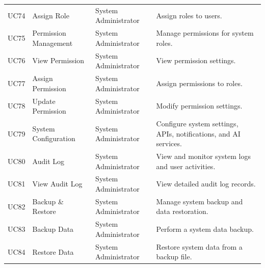 \begin{longtable}{@{}p{1.3cm}p{3cm}p{2.7cm}p{6.5cm}@{}}
UC74 & Assign Role & System Administrator & Assign roles to users. \\
UC75 & Permission Management & System Administrator & Manage permissions for system roles. \\
UC76 & View Permission & System Administrator & View permission settings. \\
UC77 & Assign Permission & System Administrator & Assign permissions to roles. \\
UC78 & Update Permission & System Administrator & Modify permission settings. \\
UC79 & System Configuration & System Administrator & Configure system settings, APIs, notifications, and AI services. \\
UC80 & Audit Log & System Administrator & View and monitor system logs and user activities. \\
UC81 & View Audit Log & System Administrator & View detailed audit log records. \\
UC82 & Backup \& Restore & System Administrator & Manage system backup and data restoration. \\
UC83 & Backup Data & System Administrator & Perform a system data backup. \\
UC84 & Restore Data & System Administrator & Restore system data from a backup file. \\
\bottomrule
\end{longtable}
